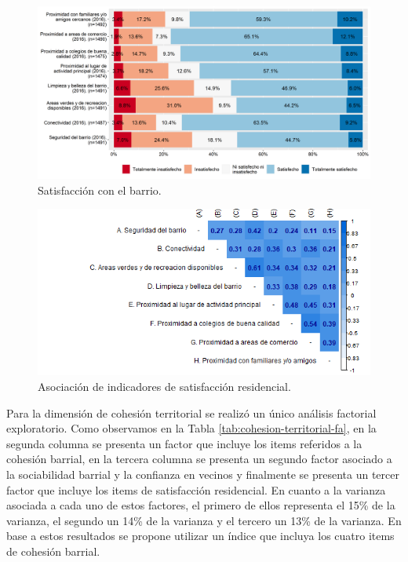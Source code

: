 \documentclass[
  12pt,
]{book}
\begin{document}
\begin{figure}[H]

{\centering \includegraphics[width=1\linewidth,height=1\textheight]{output/graphs/satisfaccion-residencial} 

}

\caption{Satisfacción con el barrio.}\label{fig:satisfaccion-residencial}
\end{figure}

\begin{figure}[H]

{\centering \includegraphics[width=1\linewidth,height=1\textheight]{output/graphs/satisfaccion-residencial_cor} 

}

\caption{Asociación de indicadores de satisfacción residencial.}\label{fig:satisfaccion-residencial-cor}
\end{figure}

Para la dimensión de cohesión territorial se realizó un único análisis factorial exploratorio. Como observamos en la Tabla \ref{tab:cohesion-territorial-fa}, en la segunda columna se presenta un factor que incluye los items referidos a la cohesión barrial, en la tercera columna se presenta un segundo factor asociado a la sociabilidad barrial y la confianza en vecinos y finalmente se presenta un tercer factor que incluye los items de satisfacción residencial. En cuanto a la varianza asociada a cada uno de estos factores, el primero de ellos representa el 15\% de la varianza, el segundo un 14\% de la varianza y el tercero un 13\% de la varianza. En base a estos resultados se propone utilizar un índice que incluya los cuatro items de cohesión barrial.
\end{document}
